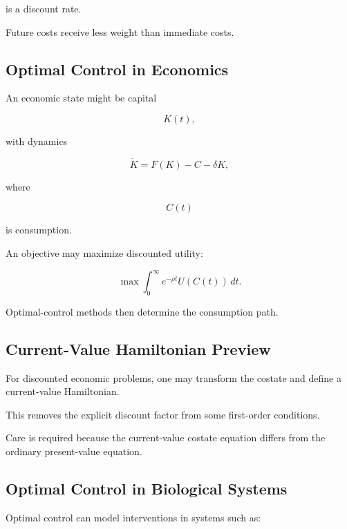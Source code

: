 is a discount rate.

Future costs receive less weight than immediate costs.

\subsection{Optimal Control in Economics}
\label{subsec:optimal-control-economics}

An economic state might be capital

\[
K(t),
\]

with dynamics

\[
\boxed{
\dot{K}
=
F(K)
-
C
-
\delta K,
}
\]

where

\[
C(t)
\]

is consumption.

An objective may maximize discounted utility:

\[
\boxed{
\max
\int_0^\infty
e^{-\rho t}
U(C(t))
\,dt.
}
\]

Optimal-control methods then determine the consumption path.

\subsection{Current-Value Hamiltonian Preview}
\label{subsec:current-value-hamiltonian}

For discounted economic problems, one may transform the costate and define
a current-value Hamiltonian.

This removes the explicit discount factor from some first-order
conditions.

Care is required because the current-value costate equation differs from
the ordinary present-value equation.

\subsection{Optimal Control in Biological Systems}
\label{subsec:optimal-control-biological}

Optimal control can model interventions in systems such as:

